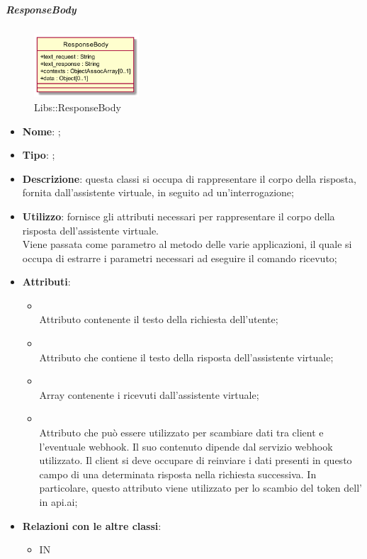 \hypertarget{ResponseBody_label}{\subparagraph{ResponseBody}}
\begin{figure}[h]
	\centering
	\includegraphics[width=0.35\textwidth,height=\textheight,keepaspectratio]{images/ClassResponseBody.png}
	\caption{Libs::ResponseBody}
\end{figure}
\begin{itemize}
	\item \textbf{Nome}: ;
	\item \textbf{Tipo}: ;
	\item \textbf{Descrizione}: questa classi si occupa di rappresentare il corpo della risposta, fornita dall'assistente virtuale, in seguito ad un'interrogazione;
	\item \textbf{Utilizzo}: fornisce gli attributi necessari per rappresentare il corpo della risposta dell'assistente virtuale. \\
Viene passata come parametro al metodo  delle varie applicazioni, il quale si occupa di estrarre i parametri necessari ad eseguire il comando ricevuto;
	\item \textbf{Attributi}:
	\begin{itemize}
		\item[]  \\
		Attributo contenente il testo della richiesta dell'utente;
		\item[]  \\
		Attributo che contiene il testo della risposta dell'assistente virtuale;
		\item[]  \\
		Array contenente i  ricevuti dall'assistente virtuale;
		\item[]  \\
		Attributo che può essere utilizzato per scambiare dati tra client e l'eventuale webhook. Il suo contenuto dipende dal servizio webhook utilizzato. Il client si deve occupare di reinviare i dati presenti in questo campo di una determinata risposta nella richiesta successiva. In particolare, questo attributo viene utilizzato per lo scambio del token dell' in api.ai;
	\end{itemize}
	\item \textbf{Relazioni con le altre classi}:
	\begin{itemize}
		\item IN \hyperlink{VAResponse_label}{}
	\end{itemize}
\end{itemize}
\FloatBarrier

